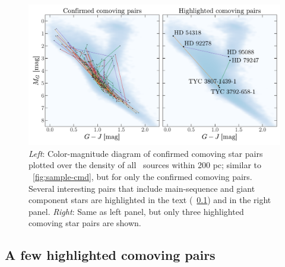 \documentclass[modern, letterpaper]{aastex61}
\newcommand{\tgas}{\acronym{TGAS}}
\begin{document}
\begin{figure}[htbp]
  \begin{center}
    \includegraphics[width=\linewidth]{genuine_highlighted_cmd.pdf}
  \end{center}
  \caption{%
    {\it Left}: Color-magnitude diagram of confirmed comoving star pairs plotted
    over the density of all \tgas\ sources within 200 pc; similar to
    \figurename~\ref{fig:sample-cmd}, but for only the confirmed comoving pairs.
    Several interesting pairs that include main-sequence and giant component
    stars are highlighted in the text (\sectionname~\ref{sec:interesting-pairs})
    and in the right panel.
    {\it Right}: Same as left panel, but only three highlighted comoving star
    pairs are shown.
    \label{fig:genuine-highlighted-cmd}}
\end{figure}

\subsection{A few highlighted comoving pairs}\label{sec:interesting-pairs}
\end{document}
